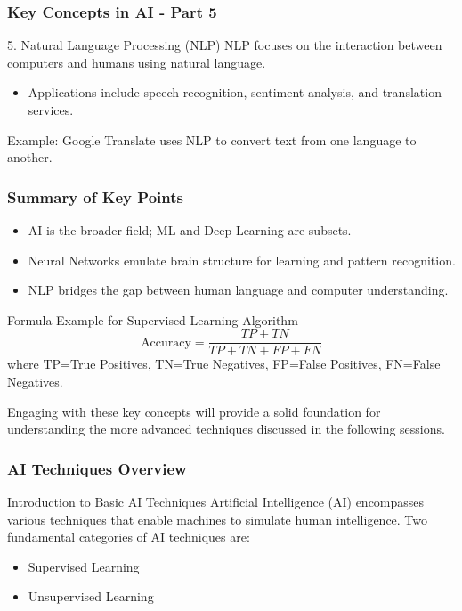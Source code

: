 \documentclass[aspectratio=169]{beamer}
\begin{document}
\begin{frame}[fragile]
    \frametitle{Key Concepts in AI - Part 5}
    \begin{block}{5. Natural Language Processing (NLP)}
        NLP focuses on the interaction between computers and humans using natural language.
    \end{block}
    \begin{itemize}
        \item Applications include speech recognition, sentiment analysis, and translation services.
    \end{itemize}
    \begin{exampleblock}{Example:}
        Google Translate uses NLP to convert text from one language to another.
    \end{exampleblock}
\end{frame}

\begin{frame}[fragile]
    \frametitle{Summary of Key Points}
    \begin{itemize}
        \item AI is the broader field; ML and Deep Learning are subsets.
        \item Neural Networks emulate brain structure for learning and pattern recognition.
        \item NLP bridges the gap between human language and computer understanding.
    \end{itemize}
    \begin{block}{Formula Example for Supervised Learning Algorithm}
        \begin{equation}
            \text{Accuracy} = \frac{TP + TN}{TP + TN + FP + FN}
        \end{equation}
        where TP=True Positives, TN=True Negatives, FP=False Positives, FN=False Negatives.
    \end{block}
    Engaging with these key concepts will provide a solid foundation for understanding the more advanced techniques discussed in the following sessions.
\end{frame}

\begin{frame}[fragile]
    \frametitle{AI Techniques Overview}
    \begin{block}{Introduction to Basic AI Techniques}
        Artificial Intelligence (AI) encompasses various techniques that enable machines to simulate human intelligence. Two fundamental categories of AI techniques are:
        \begin{itemize}
            \item Supervised Learning
            \item Unsupervised Learning
        \end{itemize}
    \end{block}
\end{frame}
\end{document}
